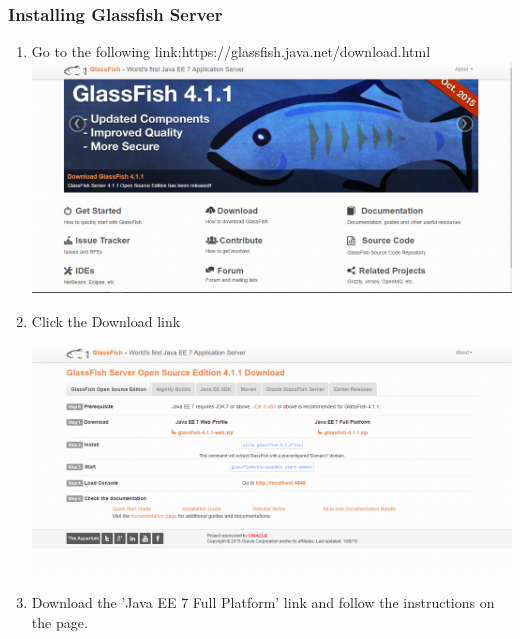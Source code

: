 \documentclass[a4paper,12pt]{article}
\begin{document}
\newpage
\subsubsection{Installing Glassfish Server}
\begin{enumerate}
\item Go to the following link:https://glassfish.java.net/download.html\\[0.2cm]
\includegraphics[width=0.9\linewidth, center]{./Installation/glassfish_download_1.PNG}\\[0.4cm]
\item Click the Download link

\includegraphics[width=0.9\linewidth, center]{./Installation/glassfish_download_2.PNG}\\[0.4cm]

\item Download  the 'Java EE 7 Full Platform' link and follow the instructions on the page.
\end{enumerate}

\newpage
\end{document}
